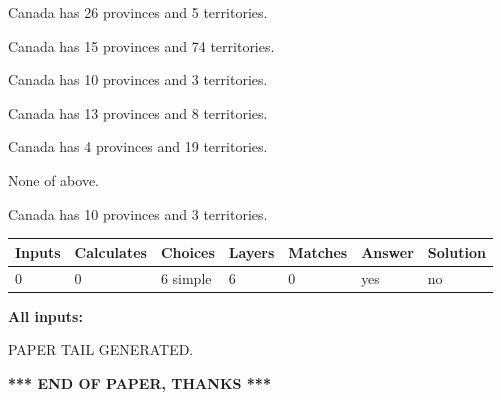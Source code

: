 \documentclass[12pt]{article}
\begin{document}
 
Canada has  26 provinces and  5 territories.
 
 
Canada has  15 provinces and  74 territories.
 
 
Canada has 10  provinces and 3 territories.
 
 
Canada has  13 provinces and  8 territories.
 
 
Canada has   4 provinces and  19 territories.
 
 
 None of above.
 
 
\noindent{}
 
 
Canada has 10  provinces and 3 territories.
 
 
\noindent{}
 
 
   
   
   
   
\noindent\begin{tabular}{|l|l|l|l|l|l|l|}
 \hline
Inputs & Calculates & Choices & Layers & Matches & Answer & Solution \\ \hline
 0  & 
 0  & 
 6
  simple  
  & 
 6  & 
 0  & 
  yes & 
  no 
  \\ \hline
 \end{tabular}
   
   
   
   
\noindent{}
   
   
   
   
\noindent\vspace{0.1in}\hspace{-0.08in} {\textbf{\Large{All inputs: }}}
   
   
   
   
   
   
 \vspace{0.2in}
 
   
   
\vspace{2.0in} PAPER TAIL GENERATED.
   
   
   
   
\vspace{1.0in} 
{\textbf{\large{ *** END OF PAPER, THANKS *** }}} 
   
\end{document}
